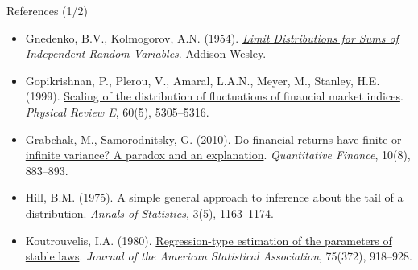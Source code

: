 \begin{frame}{References (1/2)}
\begin{itemize}
    \item Gnedenko, B.V., Kolmogorov, A.N. (1954). \href{https://archive.org/details/limitdistributio00gned_0}{\textit{Limit Distributions for Sums of Independent Random Variables}}. Addison-Wesley.
    \item Gopikrishnan, P., Plerou, V., Amaral, L.A.N., Meyer, M., Stanley, H.E. (1999). \href{https://doi.org/10.1103/PhysRevE.60.5305}{Scaling of the distribution of fluctuations of financial market indices}. \textit{Physical Review E}, 60(5), 5305--5316.
    \item Grabchak, M., Samorodnitsky, G. (2010). \href{https://doi.org/10.1080/14697680903540381}{Do financial returns have finite or infinite variance? A paradox and an explanation}. \textit{Quantitative Finance}, 10(8), 883--893.
    \item Hill, B.M. (1975). \href{https://doi.org/10.1214/aos/1176343247}{A simple general approach to inference about the tail of a distribution}. \textit{Annals of Statistics}, 3(5), 1163--1174.
    \item Koutrouvelis, I.A. (1980). \href{https://doi.org/10.1080/01621459.1980.10477573}{Regression-type estimation of the parameters of stable laws}. \textit{Journal of the American Statistical Association}, 75(372), 918--928.
\end{itemize}
\end{frame}

